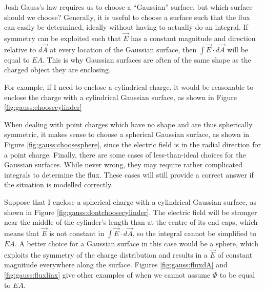 \begin{studentOpinion}{Josh}	
Gauss's law requires us to choose a ``Gaussian'' surface, but which surface should we choose? Generally, it is useful to choose a surface such that the flux can easily be determined, ideally without having to actually do an integral. If symmetry can be exploited such that $\vec E$ has a constant magnitude and direction relative to $d\vec A$ at every location of the Gaussian surface, then $\int \vec E \cdot d\vec A$ will be equal to $E A$. This is why Gaussian surfaces are often of the same shape as the charged object they are enclosing.
	
For example, if I need to enclose a cylindrical charge, it would be reasonable to enclose the charge with a cylindrical Gaussian surface, as shown in Figure \ref{fig:gauss:choosecylinder}
	
When dealing with point charges which have no shape and are thus spherically symmetric, it makes sense to choose a spherical Gaussian surface, as shown in Figure \ref{fig:gauss:choosesphere}, since the electric field is in the radial direction for a point charge.
Finally, there are some cases of less-than-ideal choices for the Gaussian surfaces. While never wrong, they may require rather complicated integrals to determine the flux. These cases will still provide a correct answer if the situation is modelled correctly.

Suppose that I enclose a spherical charge with a cylindrical Gaussian surface, as shown in Figure \ref{fig:gauss:dontchoosecylinder}. The electric field will be stronger near the middle of the cylinder's length than at the centre of its end caps, which means that $\vec E$ is not constant in $\int \vec E \cdot d \vec A$, so the integral cannot be simplified to $EA$. A better choice for a Gaussian surface in this case would be a sphere, which exploits the symmetry of the charge distribution and results in a $\vec E$ of constant magnitude everywhere along the surface. Figures \ref{fig:gauss:fluxdA} and \ref{fig:gauss:fluxlinx} give other examples of when we cannot assume $\Phi$ to be equal to $EA$.
\end{studentOpinion}

